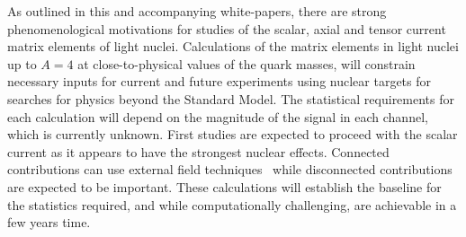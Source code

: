 As outlined in this and accompanying white-papers, there are strong phenomenological motivations for studies of the scalar, axial and tensor current matrix elements of light nuclei. Calculations of the matrix elements in light nuclei up to $A=4$ \cite{Winter:2017bfs} at close-to-physical values of the quark masses, will constrain necessary inputs for current and future experiments using nuclear targets for searches for physics beyond the Standard Model. The statistical requirements for each calculation will depend on the magnitude of the signal in each channel, which is currently unknown. First studies are expected to proceed with the scalar current as it appears to have the strongest nuclear effects. Connected contributions can use external field techniques~\cite{Savage:2016kon,Shanahan:2017bgi,Tiburzi:2017iux} while disconnected contributions are expected to be important. These calculations will establish the baseline for the statistics required, and while computationally challenging, are achievable in a few years time.



